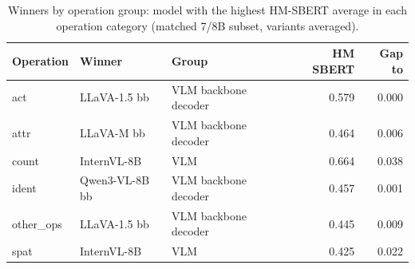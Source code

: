 \begin{table}[t]
\centering
\caption{Winners by operation group: model with the highest HM-SBERT average in each operation category (matched 7/8B subset, variants averaged).}
\label{tab:group_winners_op}
\small
\begin{tabular}{lllrr}
\toprule
Operation & Winner & Group & HM SBERT & Gap to #2 \\
\midrule
act & LLaVA-1.5 bb & VLM backbone decoder & 0.579 & 0.000 \\
attr & LLaVA-M bb & VLM backbone decoder & 0.464 & 0.006 \\
count & InternVL-8B & VLM & 0.664 & 0.038 \\
ident & Qwen3-VL-8B bb & VLM backbone decoder & 0.457 & 0.001 \\
other_ops & LLaVA-1.5 bb & VLM backbone decoder & 0.445 & 0.009 \\
spat & InternVL-8B & VLM & 0.425 & 0.022 \\
\bottomrule
\end{tabular}
\end{table}
